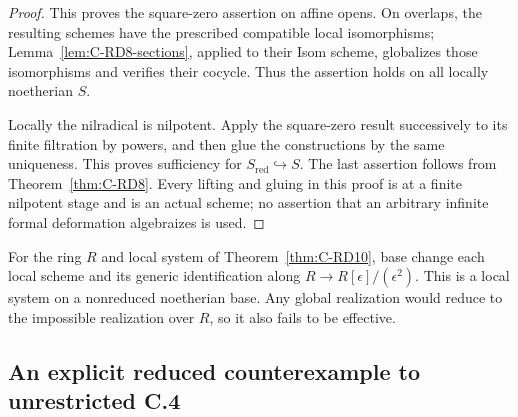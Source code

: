 \begin{proof}
This proves the square-zero assertion on affine opens. On overlaps,
the resulting schemes have the prescribed compatible local
isomorphisms; Lemma~\ref{lem:C-RD8-sections}, applied to their Isom
scheme, globalizes those isomorphisms and verifies their cocycle.
Thus the assertion holds on all locally noetherian $S$.

Locally the nilradical is nilpotent. Apply the square-zero result
successively to its finite filtration by powers, and then glue the
constructions by the same uniqueness. This proves sufficiency for
$S_{\mathrm{red}}\hookrightarrow S$. The last assertion follows
from Theorem~\ref{thm:C-RD8}. Every lifting and gluing in this proof
is at a finite nilpotent stage and is an actual scheme; no assertion
that an arbitrary infinite formal deformation algebraizes is used.
\end{proof}

\begin{remark}
For the ring $R$ and local system of Theorem~\ref{thm:C-RD10}, base
change each local scheme and its generic identification along
$R\to R[\epsilon]/(\epsilon^2)$. This is a local system on a
nonreduced noetherian base. Any global realization would reduce to
the impossible realization over $R$, so it also fails to be effective.
\end{remark}

\subsection{An explicit reduced counterexample to unrestricted C.4}


